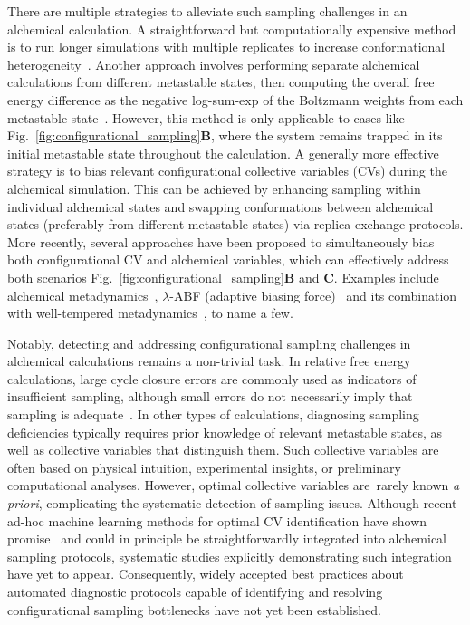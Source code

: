 \documentclass[9pt,bestpractices]{livecoms}
\begin{document}
There are multiple strategies to alleviate such sampling challenges in an alchemical calculation. A straightforward but computationally expensive method is to run longer simulations with multiple replicates to increase conformational heterogeneity~\cite{suruzhon2021sensitivity}. Another approach involves performing separate alchemical calculations from different metastable states, then computing the overall free energy difference as the negative log-sum-exp of the Boltzmann weights from each metastable state~\cite{hsu2023alchemical}. However, this method is only applicable to cases like Fig.~\ref{fig:configurational_sampling}\textbf{B}, where the system remains trapped in its initial metastable state throughout the calculation. A generally more effective strategy is to bias relevant configurational collective variables (CVs) during the alchemical simulation. This can be achieved by enhancing sampling within individual alchemical states and swapping conformations between alchemical states (preferably from different metastable states) via replica exchange protocols. More recently, several approaches have been proposed to simultaneously bias both configurational CV and alchemical variables, which can effectively address both scenarios Fig.~\ref{fig:configurational_sampling}\textbf{B} and \textbf{C}. Examples include alchemical metadynamics~\cite{hsu2023alchemical}, $\lambda$-ABF (adaptive biasing force)~\cite{lagardere2024lambda} and its combination~\cite{zhou2025zooming} with well-tempered metadynamics~\cite{barducci2008well}, to name a few.  

Notably, detecting and addressing configurational sampling challenges in alchemical calculations remains a non-trivial task. In relative free energy calculations, large cycle closure errors are commonly used as indicators of insufficient sampling, although small errors do not necessarily imply that sampling is adequate~\cite{suruzhon2021sensitivity}. In other types of calculations, diagnosing sampling deficiencies typically requires prior knowledge of relevant metastable states, as well as collective variables that distinguish them. Such collective variables are often based on physical intuition, experimental insights, or preliminary computational analyses. However, optimal collective variables are rarely known \textit{a priori}, complicating the systematic detection of sampling issues. Although recent ad-hoc machine learning methods for optimal CV identification have shown promise~\cite{gokdemir2025machine, sidky2020machine, bonati2021deep} and could in principle be straightforwardly integrated into alchemical sampling protocols, systematic studies explicitly demonstrating such integration have yet to appear. Consequently, widely accepted best practices about automated diagnostic protocols capable of identifying and resolving configurational sampling bottlenecks have not yet been established. 
\end{document}
